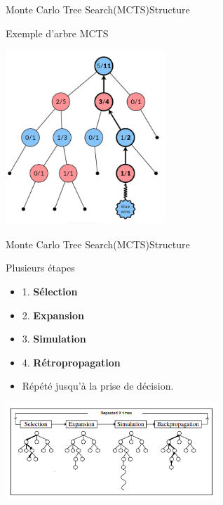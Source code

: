 \begin{frame}{Monte Carlo Tree Search(MCTS)}{Structure}
	\begin{block}{Exemple d'arbre MCTS}
		\begin{center}
			\includegraphics[width=6cm]{ressources/MCTS/tree.png}
		\end{center}
	\end{block}
\end{frame}


\begin{frame}{Monte Carlo Tree Search(MCTS)}{Structure}
	\begin{block}{Plusieurs étapes}
		\begin{itemize}
			\item 1. \textbf{Sélection}
			\item 2. \textbf{Expansion}
			\item 3. \textbf{Simulation}
			\item 4. \textbf{Rétropropagation}
			\item Répété jusqu'à la prise de décision.
		\end{itemize}
		\begin{center}
			\includegraphics[width=8cm]{ressources/MCTS/MCTSEtapes}
		\end{center}
	\end{block}
\end{frame}

